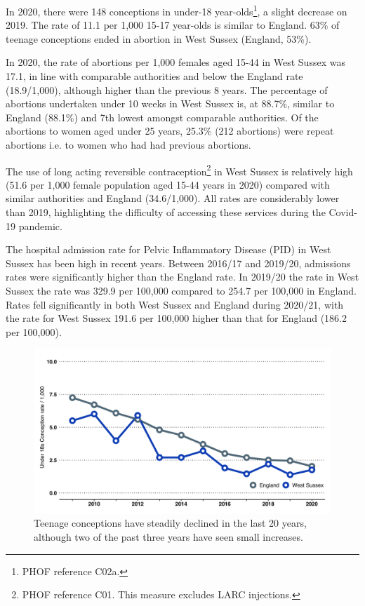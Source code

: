 
In 2020, there were 148 conceptions in under-18 year-olds\footnote{PHOF reference C02a.}, a slight decrease on 2019. The rate of 11.1 per 1,000 15-17 year-olds is similar to England. 63\% of teenage conceptions ended in abortion in West Sussex (England, 53\%).

In 2020, the rate of abortions per 1,000 females aged 15-44 in West Sussex was 17.1, in line with comparable authorities and below the England rate (18.9/1,000), although higher than the previous 8 years. The percentage of abortions undertaken under 10 weeks in West Sussex is, at 88.7\%, similar to England (88.1\%) and 7th lowest amongst comparable authorities. Of the abortions to women aged under 25 years, 25.3\% (212 abortions) were repeat abortions i.e. to women who had had previous abortions.

The use of long acting reversible contraception\footnote{PHOF reference C01. This measure excludes LARC injections.} in West Sussex is relatively high (51.6 per 1,000 female population aged 15-44 years in 2020) compared with similar authorities and England (34.6/1,000). All rates are considerably lower than 2019, highlighting the difficulty of accessing these services during the Covid-19 pandemic.

The hospital admission rate for Pelvic Inflammatory Disease (PID) in West Sussex has been high in recent years. Between 2016/17 and 2019/20, admissions rates were significantly higher than the England rate. In 2019/20 the rate in West Sussex the rate was 329.9 per 100,000 compared to 254.7 per 100,000 in England. Rates fell significantly in both West Sussex and England during 2020/21, with the rate for West Sussex 191.6 per 100,000 higher than that for England (186.2 per 100,000).
 
\begin{figure}[ht]
    \caption{Teenage conceptions have steadily declined in the last 20 years, although two of the past three years have seen small increases.}\label{fig:teen_conc}
    \centering
    \includegraphics[width = \linewidth]{images/u18s_conc_line.png}
\end{figure}

